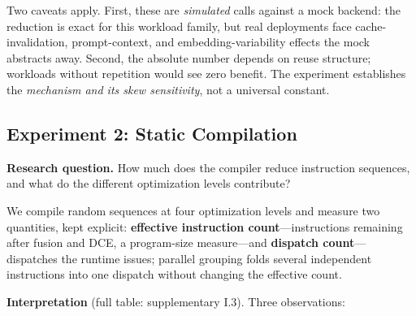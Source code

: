 \documentclass[
  sigconf,
  anonymous]{acmart}
\begin{document}
Two caveats apply. First, these are \emph{simulated} calls against a
mock backend: the reduction is exact for this workload family, but real
deployments face cache-invalidation, prompt-context, and
embedding-variability effects the mock abstracts away. Second, the
absolute number depends on reuse structure; workloads without repetition
would see zero benefit. The experiment establishes the \emph{mechanism
and its skew sensitivity}, not a universal constant.

\subsection{Experiment 2: Static
Compilation}\label{experiment-2-static-compilation}

\textbf{Research question.} How much does the compiler reduce
instruction sequences, and what do the different optimization levels
contribute?

We compile random sequences at four optimization levels and measure two
quantities, kept explicit: \textbf{effective instruction
count}---instructions remaining after fusion and DCE, a program-size
measure---and \textbf{dispatch count}---dispatches the runtime issues;
parallel grouping folds several independent instructions into one
dispatch without changing the effective count.

\textbf{Interpretation} (full table: supplementary I.3). Three
observations:
\end{document}
